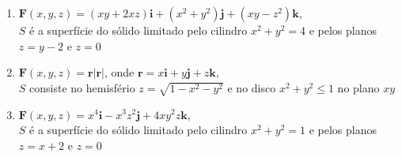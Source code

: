 \documentclass[a4paper, 12pt]{article}
\begin{document}
\begin{enumerate}
		\item $\textbf{F}(x,y,z) = (xy + 2xz)\textbf{i} + (x^2 + y^2)\textbf{j} + (xy - z^2)\textbf{k}$, \\ $S$ é a superfície do sólido limitado pelo cilindro $x^2 + y^2 = 4$ e pelos planos $z = y - 2$ e $z = 0$
		\resposta{$4\pi$}

		\item $\textbf{F}(x,y,z) = \textbf{r} |\textbf{r}|$, onde $\textbf{r} = x\textbf{i} + y\textbf{j} + z\textbf{k}$, \\ $S$ consiste no hemisfério $z = \sqrt{1 - x^2 - y^2}$ e no disco $x^2 + y^2 \leq 1$ no plano $xy$
		\resposta{$2\pi$}

		\item $\textbf{F}(x,y,z) = x^{4}\textbf{i} - x^{3}z^{2}\textbf{j} + 4xy^{2}z\textbf{k}$, \\ $S$ é a superfície do sólido limitado pelo cilindro $x^2 + y^2 = 1$ e pelos planos $z = x + 2$ e $z = 0$
	
	\end{enumerate}
		
	\vspace{5mm}	
	
\end{document}
